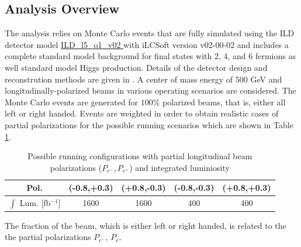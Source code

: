 \subsection{Analysis Overview}
\label{subsec:ana_overview}
The analysis relies on Monte Carlo events that are fully simulated using the ILD detector model \url{ ILD_l5_o1_v02 } with iLCSoft version v02-00-02 and includes a complete standard model background for final states with 2, 4, and 6 fermions as well standard model Higgs production. Details of the detector design and reconstrution methods are given in \cite{ILDIDR}.  A center of mass energy of 500 GeV and longitudinally-polarized beams in various operating scenarios are considered. The Monte Carlo events are generated for $100\%$ polarized beams, that is, either all left or right handed. Events are weighted in order to obtain realistic cases of partial polarizations for the possible running scenarios which are shown in Table \ref{tab:beamscenario}.

\begin{table}

\caption{Possible running configurations with partial longitudinal beam polarizations ($P_{e^-},P_{e^+}$) and integrated luminiosity \cite{ilcop} }
\label{tab:beamscenario}
\begin{tabular}{|c|c|c|c|c|}
\hline 
Pol. &(-0.8,+0.3) & (+0.8,-0.3) & (-0.8,-0.3) & (+0.8,+0.3) \\ 
\hline 
$\int$ Lum. [fb$^{-1}$] & 1600 & 1600 & 400 & 400 \\ 
\hline 
\end{tabular} 

\end{table}
 The fraction of the beam, which is either left or right handed, is related to the the partial polarizations $P_{e^-}$, $P_{e^+}$ 
 
